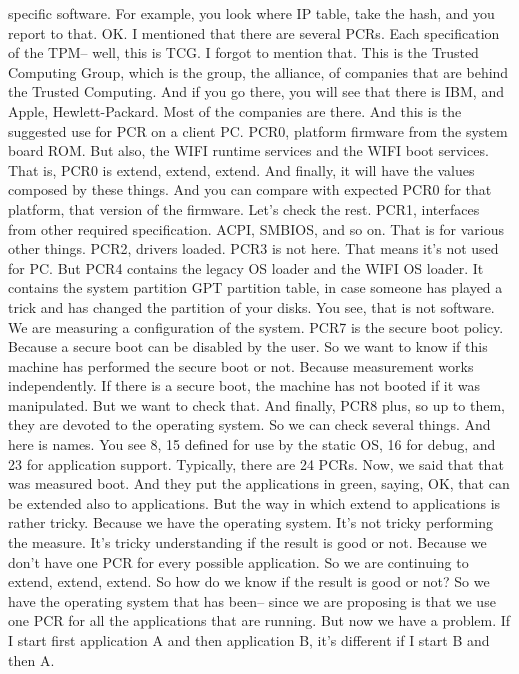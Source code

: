  specific software. For example, you look where IP table, take the hash, and
 you report to that. OK. I mentioned that there are several PCRs. Each
 specification of the TPM-- well, this is TCG. I forgot to mention that. This
 is the Trusted Computing Group, which is the group, the alliance, of companies
 that are behind the Trusted Computing. And if you go there, you will see that
 there is IBM, and Apple, Hewlett-Packard. Most of the companies are there. And
 this is the suggested use for PCR on a client PC. PCR0, platform firmware from
 the system board ROM. But also, the WIFI runtime services and the WIFI boot
 services. That is, PCR0 is extend, extend, extend. And finally, it will have
 the values composed by these things. And you can compare with expected PCR0
 for that platform, that version of the firmware. Let's check the rest. PCR1,
 interfaces from other required specification. ACPI, SMBIOS, and so on. That is
 for various other things. PCR2, drivers loaded. PCR3 is not here. That means
 it's not used for PC. But PCR4 contains the legacy OS loader and the WIFI OS
 loader. It contains the system partition GPT partition table, in case someone
 has played a trick and has changed the partition of your disks. You see, that
 is not software. We are measuring a configuration of the system. PCR7 is the
 secure boot policy. Because a secure boot can be disabled by the user. So we
 want to know if this machine has performed the secure boot or not. Because
 measurement works independently. If there is a secure boot, the machine has
 not booted if it was manipulated. But we want to check that. And finally, PCR8
 plus, so up to them, they are devoted to the operating system. So we can check
 several things. And here is names. You see 8, 15 defined for use by the static
 OS, 16 for debug, and 23 for application support. Typically, there are 24
 PCRs. Now, we said that that was measured boot. And they put the applications
 in green, saying, OK, that can be extended also to applications. But the way
 in which extend to applications is rather tricky. Because we have the
 operating system. It's not tricky performing the measure. It's tricky
 understanding if the result is good or not. Because we don't have one PCR for
 every possible application. So we are continuing to extend, extend, extend. So
 how do we know if the result is good or not? So we have the operating system
 that has been-- since we are proposing is that we use one PCR for all the
 applications that are running. But now we have a problem. If I start first
 application A and then application B, it's different if I start B and then A.
